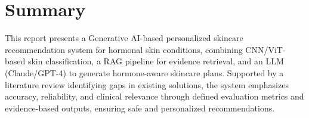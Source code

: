 \chapter{Summary}
\hspace*{0.5in}This report presents a Generative AI-based personalized skincare recommendation system for hormonal skin conditions, combining CNN/ViT-based skin classification, a RAG pipeline for evidence retrieval, and an LLM (Claude/GPT-4) to generate hormone-aware skincare plans. Supported by a literature review identifying gaps in existing solutions, the system emphasizes accuracy, reliability, and clinical relevance through defined evaluation metrics and evidence-based outputs, ensuring safe and personalized recommendations.
